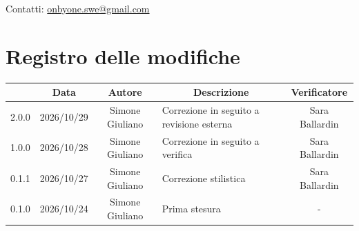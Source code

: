 \documentclass[11pt, a4paper]{article}
\begin{document}
\begin{titlepage}
    \vspace{0.5cm}
    
    {\large Contatti: \href{mailto:onbyone.swe@gmail.com}{onbyone.swe@gmail.com} }
    
\end{titlepage}

\section*{Registro delle modifiche}

\vspace{1cm}
\begin{center}
    \renewcommand{\arraystretch}{1.5}
    \begin{tabularx}{\textwidth}{|c|c|c|X|c|}
        \hline
        \rowcolor{gray!10} 
        \multicolumn{1}{|c|}{\textbf{Versione}} & 
        \multicolumn{1}{c|}{\textbf{Data}} & 
        \multicolumn{1}{c|}{\textbf{Autore}} & 
        \multicolumn{1}{c|}{\textbf{Descrizione}} & 
        \multicolumn{1}{c|}{\textbf{Verificatore}} \\
         \hline
        2.0.0 & 2026/10/29 & Simone Giuliano & Correzione in seguito a revisione esterna & Sara Ballardin \\
        \hline
        1.0.0 & 2026/10/28 & Simone Giuliano & Correzione in seguito a verifica & Sara Ballardin \\
        \hline
        0.1.1 & 2026/10/27 & Simone Giuliano & Correzione stilistica & Sara Ballardin \\
        \hline
        0.1.0 & 2026/10/24 & Simone Giuliano & Prima stesura & - \\
        \hline
    \end{tabularx}
\end{center}
\vfill
\newpage

\tableofcontents
\newpage

\end{document}
